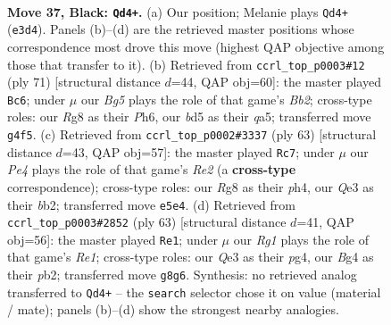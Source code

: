\documentclass[11pt]{article}
\begin{document}
\clearpage

\begin{figure}[p]\centering
\begin{subfigure}{0.46\textwidth}\centering
\resizebox{\linewidth}{!}{%
\newchessgame
\chessboard[
  setfen={5kr1/p4p2/7p/2PBp1p1/6b1/4q3/PK6/8 b - - 3 37},
  showmover=false,
  pgfstyle=straightmove, color=movearrow, markmove={e3-d4}
]}
\caption{}
\end{subfigure}\hfill
\begin{subfigure}{0.46\textwidth}\centering
\resizebox{\linewidth}{!}{%
\newchessgame
\chessboard[
  setfen={6k1/1b3p2/3q2pp/Q2p4/8/4PBPP/5P2/6K1 b - - 0 36},
  showmover=false,
  pgfstyle=straightmove, color=movearrow, markmove={b7-c6}
]}
\caption{}
\end{subfigure}
\\[4pt]
\begin{subfigure}{0.46\textwidth}\centering
\resizebox{\linewidth}{!}{%
\newchessgame
\chessboard[
  setfen={6k1/4rppp/p7/4p3/2B4P/6P1/PB6/6K1 b - - 0 32},
  showmover=false,
  pgfstyle=straightmove, color=movearrow, markmove={e7-c7}
]}
\caption{}
\end{subfigure}\hfill
\begin{subfigure}{0.46\textwidth}\centering
\resizebox{\linewidth}{!}{%
\newchessgame
\chessboard[
  setfen={4r1k1/pp3p1p/6p1/3B4/P5P1/5K1P/1P6/2N5 b - - 0 32},
  showmover=false,
  pgfstyle=straightmove, color=movearrow, markmove={e8-e1}
]}
\caption{}
\end{subfigure}
\caption{\textbf{Move 37, Black: \texttt{Qd4+}.} (a) Our position; Melanie plays \texttt{Qd4+} (\texttt{e3d4}). Panels (b)--(d) are the retrieved master positions whose correspondence most drove this move (highest QAP objective among those that transfer to it). (b) Retrieved from \texttt{ccrl\_top\_p0003\#12} (ply 71) [structural distance $d$=44, QAP obj=60]: the master played \texttt{Bc6}; under $\mu$ our \emph{Bg5} plays the role of that game's \emph{Bb2}; cross-type roles: our \emph{R}g8 as their \emph{P}h6, our \emph{b}d5 as their \emph{q}a5; transferred move \texttt{g4f5}. (c) Retrieved from \texttt{ccrl\_top\_p0002\#3337} (ply 63) [structural distance $d$=43, QAP obj=57]: the master played \texttt{Rc7}; under $\mu$ our \emph{Pe4} plays the role of that game's \emph{Re2} (a \textbf{cross-type} correspondence); cross-type roles: our \emph{R}g8 as their \emph{p}h4, our \emph{Q}e3 as their \emph{b}b2; transferred move \texttt{e5e4}. (d) Retrieved from \texttt{ccrl\_top\_p0003\#2852} (ply 63) [structural distance $d$=41, QAP obj=56]: the master played \texttt{Re1}; under $\mu$ our \emph{Rg1} plays the role of that game's \emph{Re1}; cross-type roles: our \emph{Q}e3 as their \emph{p}g4, our \emph{B}g4 as their \emph{p}b2; transferred move \texttt{g8g6}. Synthesis: no retrieved analog transferred to \texttt{Qd4+} -- the \texttt{search} selector chose it on value (material / mate); panels (b)--(d) show the strongest nearby analogies.}
\label{fig:thought-m73}
\end{figure}
\end{document}
